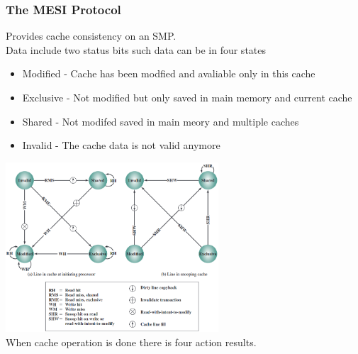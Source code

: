 \documentclass[12pt, a4paper]{article}
\begin{document}
			\subsubsection{The MESI Protocol}
				Provides cache consistency on an SMP.\\
				Data include two status bits such data can be in four states
				\begin{itemize}
					\item Modified - Cache has been modfied and avaliable only in this cache
					\item Exclusive - Not modified but only saved in main memory and current cache
					\item Shared - Not modifed saved in main meory and multiple caches
					\item Invalid - The cache data is not valid anymore
				\end{itemize}
				\includegraphics[width=300px]{assets/MESI.png}\\
				When cache operation is done there is four action results.\\
\end{document}
